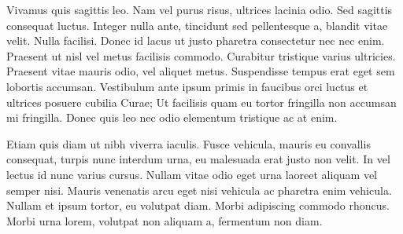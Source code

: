 \documentclass[submission]{gmp2015}
\begin{document}
Vivamus quis sagittis leo. Nam vel purus risus, ultrices lacinia odio. Sed sagittis consequat luctus. Integer nulla ante, tincidunt sed pellentesque a, blandit vitae velit. Nulla facilisi. Donec id lacus ut justo pharetra consectetur nec nec enim. Praesent ut nisl vel metus facilisis commodo. Curabitur tristique varius ultricies. Praesent vitae mauris odio, vel aliquet metus. Suspendisse tempus erat eget sem lobortis accumsan. Vestibulum ante ipsum primis in faucibus orci luctus et ultrices posuere cubilia Curae; Ut facilisis quam eu tortor fringilla non accumsan mi fringilla. Donec quis leo nec odio elementum tristique ac at enim.

Etiam quis diam ut nibh viverra iaculis. Fusce vehicula, mauris eu convallis consequat, turpis nunc interdum urna, eu malesuada erat justo non velit. In vel lectus id nunc varius cursus. Nullam vitae odio eget urna laoreet aliquam vel semper nisi. Mauris venenatis arcu eget nisi vehicula ac pharetra enim vehicula. Nullam et ipsum tortor, eu volutpat diam. Morbi adipiscing commodo rhoncus. Morbi urna lorem, volutpat non aliquam a, fermentum non diam.




\end{document}
